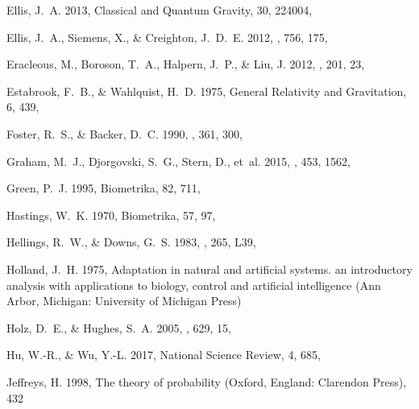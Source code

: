\documentclass[times,tight]{aastex631}
\begin{document}
\begin{thebibliography}{}
{Ellis}, J.~A. 2013, Classical and Quantum Gravity, 30, 224004,

{Ellis}, J.~A., {Siemens}, X., \& {Creighton}, J.~D.~E. 2012, \apj, 756, 175,

{Eracleous}, M., {Boroson}, T.~A., {Halpern}, J.~P., \& {Liu}, J. 2012, \apjs,
  201, 23, 

{Estabrook}, F.~B., \& {Wahlquist}, H.~D. 1975, General Relativity and
  Gravitation, 6, 439, 

{Foster}, R.~S., \& {Backer}, D.~C. 1990, \apj, 361, 300,

{Graham}, M.~J., {Djorgovski}, S.~G., {Stern}, D., {et~al.} 2015, \mnras, 453,
  1562, 

{Green}, P.~J. 1995, Biometrika, 82, 711, 

Hastings, W.~K. 1970, Biometrika, 57, 97, 

{Hellings}, R.~W., \& {Downs}, G.~S. 1983, \apjl, 265, L39,

{Holland}, J.~H. 1975, {Adaptation in natural and artificial systems. an
  introductory analysis with applications to biology, control and artificial
  intelligence} (Ann Arbor, Michigan: University of Michigan Press)

{Holz}, D.~E., \& {Hughes}, S.~A. 2005, \apj, 629, 15, 

Hu, W.-R., \& Wu, Y.-L. 2017, National Science Review, 4, 685,

{Jeffreys}, H. 1998, The theory of probability (Oxford, England: Clarendon
  Press), 432


\end{thebibliography}
\end{document}
